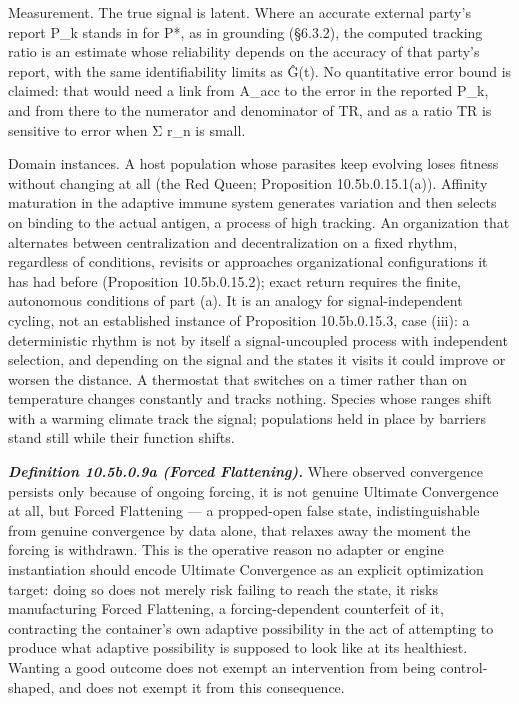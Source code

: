 \documentclass[
]{article}
\begin{document}
Measurement. The true signal is latent. Where an accurate external
party's report P\_k stands in for P*, as in grounding (§6.3.2), the
computed tracking ratio is an estimate whose reliability depends on the
accuracy of that party's report, with the same identifiability limits as
Ĝ(t). No quantitative error bound is claimed: that would need a link
from A\_acc to the error in the reported P\_k, and from there to the
numerator and denominator of TR, and as a ratio TR is sensitive to error
when Σ r\_n is small.

Domain instances. A host population whose parasites keep evolving loses
fitness without changing at all (the Red Queen; Proposition
10.5b.0.15.1(a)). Affinity maturation in the adaptive immune system
generates variation and then selects on binding to the actual antigen, a
process of high tracking. An organization that alternates between
centralization and decentralization on a fixed rhythm, regardless of
conditions, revisits or approaches organizational configurations it has
had before (Proposition 10.5b.0.15.2); exact return requires the finite,
autonomous conditions of part (a). It is an analogy for
signal-independent cycling, not an established instance of Proposition
10.5b.0.15.3, case (iii): a deterministic rhythm is not by itself a
signal-uncoupled process with independent selection, and depending on
the signal and the states it visits it could improve or worsen the
distance. A thermostat that switches on a timer rather than on
temperature changes constantly and tracks nothing. Species whose ranges
shift with a warming climate track the signal; populations held in place
by barriers stand still while their function shifts.

\emph{\textbf{Definition 10.5b.0.9a (Forced Flattening).}} Where
observed convergence persists only because of ongoing forcing, it is not
genuine Ultimate Convergence at all, but Forced Flattening --- a
propped-open false state, indistinguishable from genuine convergence by
data alone, that relaxes away the moment the forcing is withdrawn. This
is the operative reason no adapter or engine instantiation should encode
Ultimate Convergence as an explicit optimization target: doing so does
not merely risk failing to reach the state, it risks manufacturing
Forced Flattening, a forcing-dependent counterfeit of it, contracting
the container's own adaptive possibility in the act of attempting to
produce what adaptive possibility is supposed to look like at its
healthiest. Wanting a good outcome does not exempt an intervention from
being control-shaped, and does not exempt it from this consequence.
\end{document}
